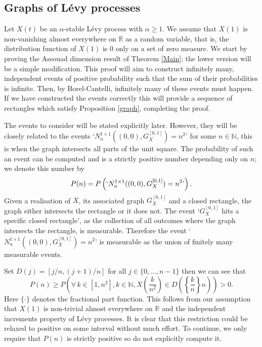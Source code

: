 \subsection{Graphs of L\'evy processes}\label{LP}

Let $X(t)$ be an $\alpha$-stable L\'evy process with $\alpha \ge 1$. We assume that $X(1)$ is non-vanishing almost everywhere on $\mathbb{R}$ as a random variable, that is, the distribution function of $X(1)$ is 0 only on a set of zero measure. We start by proving the Assouad dimension result of Theorem \ref{Main}; the lower version will be a simple modification. This proof will aim to construct infinitely many, independent events of positive probability such that the sum of their probabilities is infinite. Then, by Borel-Cantelli, infinitely many of these events must happen. If we have constructed the events correctly this will provide a sequence of rectangles which satisfy Proposition \ref{graph}, completing the proof.

The events to consider will be stated explicitly later. However, they will be closely related to the events `$N_{n}^{1 \times 1 }((0,0),G_X^{[0,1]})=n^2$' for some $n\in \mathbb{N}$, this is when the graph intersects all parts of the unit square. The probability of such an event can be computed and is a strictly positive number depending only on $n$; we denote this number by 
\[
P(n) = P\left( `N_{n}^{1 \times 1 }((0,0),G_X^{[0,1]})=n^{2} \textup{'}  \right). 
\]
Given a realisation of $X$, its associated graph $G_X^{[0,1]}$ and a closed rectangle, the graph either intersects the rectangle or it does not. The event `$G_X^{[0,1]}$ hits a specific closed rectangle', as the collection of all outcomes where the graph intersects the rectangle, is measurable. Therefore the event `$N_{n}^{1 \times 1 }((0,0),G_X^{[0,1]})=n^2$' is measurable as the union of finitely many measurable events.


Set $D(j)=[j/n,(j+1)/n]$ for all $j\in\{0,\dots, n-1\}$ then we can see that
\[
P(n)\geq P\left(\forall \, k\in\left[1,n^2\right], k\in \mathbb{N},X\left(\frac{k}{n^2}\right)\in D\left(\left\{\frac{k}{n}\right\}n\right)\right)>0.
\]
Here $\{ \cdot \}$ denotes the fractional part function. This follows from our assumption that $X(1)$ is non-trivial almost everywhere on $\mathbb{R}$ and the independent increments property of L\'evy processes. It is clear that this restriction could be relaxed to positive on some interval without much effort. To continue, we only require that $P(n)$ is strictly positive so do not explicitly compute it.


